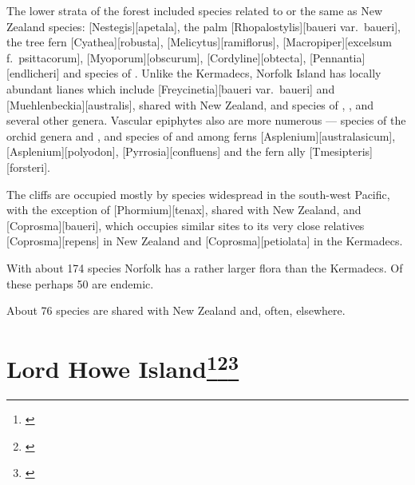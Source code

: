 The lower strata of the forest included species related to or the same as New Zealand species: [Nestegis][apetala], the palm [Rhopalostylis][baueri var.\ baueri], the tree fern [Cyathea][robusta], [Melicytus][ramiflorus], [Macropiper][excelsum f.\ psittacorum], [Myoporum][obscurum], [Cordyline][obtecta], [Pennantia][endlicheri] and species of .
Unlike the Kermadecs, Norfolk Island has locally abundant lianes which include [Freycinetia][baueri var.\ baueri] and [Muehlenbeckia][australis], shared with New Zealand, and species of , ,  and several other genera.
Vascular epiphytes also are more numerous --- species of the orchid genera  and , and species of  and among ferns [Asplenium][australasicum], [Asplenium][polyodon], [Pyrrosia][confluens] and the fern ally [Tmesipteris][forsteri].

The cliffs are occupied mostly by species widespread in the south-west Pacific, with the exception of [Phormium][tenax], shared with New Zealand, and [Coprosma][baueri], which occupies similar sites to its very close relatives [Coprosma][repens] in New Zealand and [Coprosma][petiolata] in the Kermadecs.

With about 174 species Norfolk has a rather larger flora than the Kermadecs.
Of these perhaps 50 are endemic.

About 76 species are shared with New Zealand and, often, elsewhere.

\section[Lord Howe Island]{Lord Howe Island\footnote{\cite{oliver1896vegetation}}\footnote{\cite{green1979observations}}\footnote{\cite{hutton1986lord}}}

